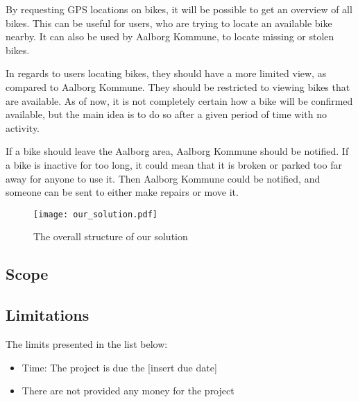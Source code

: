 By requesting GPS locations on bikes, it will be possible to get an overview of all bikes.
This can be useful for users, who are trying to locate an available bike nearby.
It can also be used by Aalborg Kommune, to locate missing or stolen bikes.

In regards to users locating bikes, they should have a more limited view, as compared to Aalborg Kommune.
They should be restricted to viewing bikes that are available.
As of now, it is not completely certain how a bike will be confirmed available, but the main idea is to do so after a given period of time with no activity.

If a bike should leave the Aalborg area, Aalborg Kommune should be notified.
If a bike is inactive for too long, it could mean that it is broken or parked too far away for anyone to use it.
Then Aalborg Kommune could be notified, and someone can be sent to either make repairs or move it.

\begin{figure}
\texttt{[image: our\_solution.pdf]}
\caption{The overall structure of our solution}
\end{figure}

\subsection{Scope}

\subsection{Limitations}
The limits presented in the list below:
\begin{itemize}
\item Time: The project is due the [insert due date]
\item There are not provided any money for the project
\end{itemize}